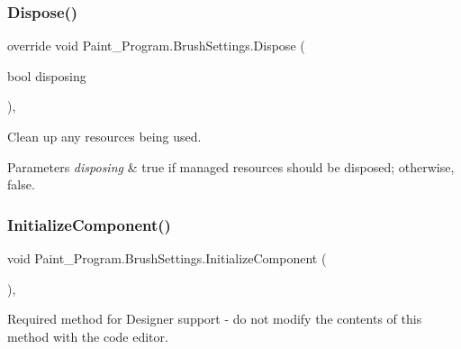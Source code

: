 \subsubsection{\texorpdfstring{Dispose()}{Dispose()}}
{\footnotesize\ttfamily override void Paint\+\_\+\+Program.\+Brush\+Settings.\+Dispose (\begin{DoxyParamCaption}\item[{bool}]{disposing }\end{DoxyParamCaption})\hspace{0.3cm}{\ttfamily [inline]}, {\ttfamily [protected]}}



Clean up any resources being used. 


\begin{DoxyParams}{Parameters}
{\em disposing} & true if managed resources should be disposed; otherwise, false.\\
\hline
\end{DoxyParams}
\mbox{\label{class_paint___program_1_1_brush_settings_a9d332d1302bbf06495360c3a281bd49b}} 
\subsubsection{\texorpdfstring{Initialize\+Component()}{InitializeComponent()}}
{\footnotesize\ttfamily void Paint\+\_\+\+Program.\+Brush\+Settings.\+Initialize\+Component (\begin{DoxyParamCaption}{ }\end{DoxyParamCaption})\hspace{0.3cm}{\ttfamily [inline]}, {\ttfamily [private]}}



Required method for Designer support -\/ do not modify the contents of this method with the code editor. 

\mbox{\label{class_paint___program_1_1_brush_settings_afe09accaa86f4448f40ddba23ba97abe}} 
